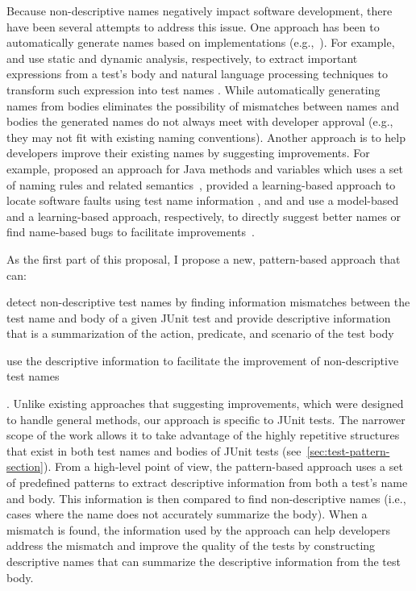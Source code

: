 Because non-descriptive names negatively impact software development, there have been several attempts to address this issue.
%
One approach has been to automatically generate names based on implementations (e.g.,~\cite{arcuri2014automated, zhang2015automatically, daka2017generating}).
%
For example, \citeauthor{zhang2015automatically} and \citeauthor{daka2017generating} use static and dynamic analysis, respectively, to extract important expressions from a test's body and natural language processing techniques to transform such expression into test names \cite{zhang2015automatically, daka2017generating}. 
%
While automatically generating names from bodies eliminates the possibility of mismatches between names and bodies the generated names do not always meet with developer approval (e.g., they may not fit with existing naming conventions).
%
Another approach is to help developers improve their existing names by suggesting improvements.
%
For example, \citeauthor{host2009debugging} proposed an approach for Java methods and variables which uses a set of naming rules and related semantics~\cite{host2009debugging}, \citeauthor{li2019deepfl} provided a learning-based approach to locate software faults using test name information \cite{li2019deepfl}, and \citeauthor{allamanis2015suggesting} and \citeauthor{pradel2018deepbugs} use a model-based and a learning-based approach, respectively, to directly suggest better names or find name-based bugs to facilitate improvements~\cite{allamanis2015suggesting, pradel2018deepbugs}.


As the first part of this proposal, I propose a new, pattern-based approach that can:
\begin{enumerate*}
\item detect non-descriptive test names by finding information mismatches between the test name and body of a given JUnit test and provide descriptive information that is a summarization of the action, predicate, and scenario of the test body
\item use the descriptive information to facilitate the improvement of non-descriptive test names
\end{enumerate*}.
%
Unlike existing approaches that suggesting improvements, which were designed to handle general methods, our approach is specific to JUnit tests.
%
The narrower scope of the work allows it to take advantage of the highly repetitive structures that exist in both test names and bodies of JUnit tests (see~\cref{sec:test-pattern-section}).
%
From a high-level point of view, the pattern-based approach uses a set of predefined patterns to extract descriptive information from both a test's name and body.
%
This information is then compared to find non-descriptive names (i.e., cases where the name does not accurately summarize the body).
%
When a mismatch is found, the information used by the approach can help developers address the mismatch and improve the quality of the tests by constructing descriptive names that can summarize the descriptive information from the test body.


